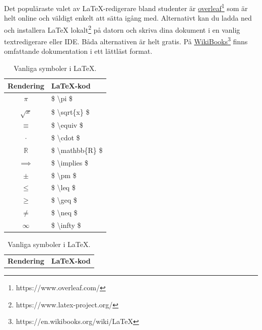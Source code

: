 \documentclass[titlepage]{article}
\begin{document}
Det populäraste valet av \LaTeX-redigerare bland studenter är \href{https://www.overleaf.com/}{overleaf}\footnote{https://www.overleaf.com/} som är helt online och väldigt enkelt att sätta igång med. Alternativt kan du ladda ned och installera \LaTeX $ $ lokalt\footnote{https://www.latex-project.org/} på datorn och skriva dina dokument i en vanlig textredigerare eller IDE. Båda alternativen är helt gratis. På \href{https://en.wikibooks.org/wiki/LaTeX}{WikiBooks}\footnote{https://en.wikibooks.org/wiki/LaTeX} finns omfattande dokumentation i ett lättläst format.

\begin{table}[h]
\begin{minipage}[b]{.5\linewidth}
    \begin{center}
    \begin{tabular}{| c | l |}
        \hline 
        \textbf{Rendering} & \textbf{\LaTeX-kod} \\
        \hline
        $\pi$ & \$ \textbackslash pi \$ \\
        \hline
        $\sqrt{ x }$ & \$ \textbackslash sqrt\{x\} \$ \\
        \hline
        $\equiv$ & \$ \textbackslash equiv \$ \\
        \hline
        $\cdot$ & \$ \textbackslash cdot \$ \\
        \hline
        $\mathbb{R}$ & \$ \textbackslash mathbb\{R\} \$ \\
        \hline
        $\implies$ & \$ \textbackslash implies \$ \\
        \hline
        $\pm$ & \$ \textbackslash pm \$ \\
        \hline
        $\leq$ & \$ \textbackslash leq \$ \\
        \hline
        $\geq$ & \$ \textbackslash geq \$ \\
        \hline
        $\neq$ & \$ \textbackslash neq \$ \\
        \hline
        $\infty$ & \$ \textbackslash infty \$ \\
        \hline
    \end{tabular}
    \caption{Vanliga symboler i \LaTeX.}
    \label{t1}
    \end{center}
\end{minipage}
\begin{minipage}[b]{.5\linewidth}
    \begin{center}
        \begin{tabular}{| l | l |}
            \hline
            \textbf{Rendering} & \textbf{\LaTeX-kod} \\

\end{tabular}
\end{center}
\end{minipage}
\end{table}
\end{document}

